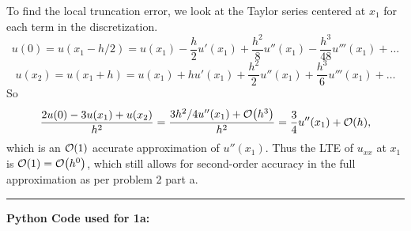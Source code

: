 \documentclass[12pt]{article}
\begin{document}
To find the local truncation error, we look at the Taylor series centered at $x_1$ for each term in the discretization.
$$u(0) = u(x_1 - h/2) = u(x_1) - \dfrac{h}{2}u'(x_1) + \dfrac{h^2}{8}u''(x_1) - \dfrac{h^3}{48}u'''(x_1) + \dots$$
$$u(x_2) = u(x_1 + h) = u(x_1) + hu'(x_1) + \dfrac{h^2}{2}u''(x_1) + \dfrac{h^3}{6}u'''(x_1) + \dots$$
So $$\dfrac{2u(0)-3u(x_1) + u(x_2)}{h^2} = \dfrac{3h^2/4  u''(x_1) + \order{h^3}}{h^2} = \dfrac{3}{4} u''(x_1) + \order{h},$$
which is an $\order{1}$ accurate approximation of $u''(x_1)$.  Thus the LTE of $u_{xx}$ at $x_1$ is $\order{1}=\order{h^0}$, which still allows for second-order accuracy in the full approximation as per problem 2 part a.

\noindent\rule{17cm}{0.4pt}

\noindent \textbf{Python Code used for 1a:}
\end{document}
